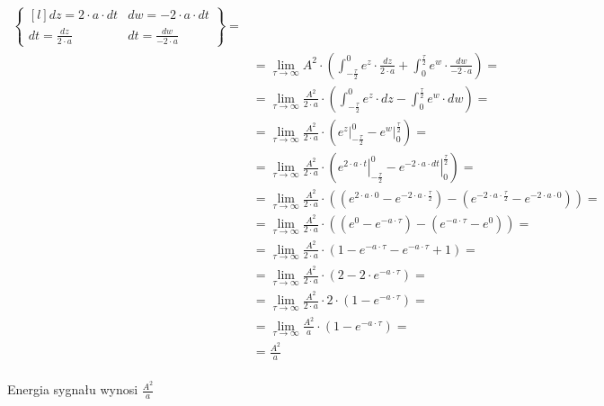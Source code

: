 \begin{task}
\begin{align*}
\begin{Bmatrix*}[l]
   dz = 2 \cdot a \cdot dt & dw=-2 \cdot a \cdot dt\\
   dt = \frac{dz}{2\cdot a} & dt = \frac{dw}{-2 \cdot a}
   \end{Bmatrix*}=\\
 &=\lim_{\tau \rightarrow \infty} A^2 \cdot \left( 
    \int_{-\frac{\tau}{2}}^{0}  e^{z} \cdot \frac{dz}{2\cdot a} 
 +  \int_{0}^{\frac{\tau}{2}} e^{w} \cdot \frac{dw}{-2\cdot a} \right)=\\
 &=\lim_{\tau \rightarrow \infty} \frac{A^2}{2\cdot a} \cdot \left( 
    \int_{-\frac{\tau}{2}}^{0}  e^{z} \cdot dz 
 -  \int_{0}^{\frac{\tau}{2}} e^{w} \cdot dw \right)=\\
 &=\lim_{\tau \rightarrow \infty} \frac{A^2}{2\cdot a} \cdot \left( 
    \left. e^{z} \right|_{-\frac{\tau}{2}}^{0} 
 -  \left. e^{w} \right|_{0}^{\frac{\tau}{2}} \right)=\\ 
 &=\lim_{\tau \rightarrow \infty} \frac{A^2}{2\cdot a} \cdot \left( 
    \left. e^{2\cdot a \cdot t} \right|_{-\frac{\tau}{2}}^{0} 
 -  \left. e^{-2 \cdot a \cdot dt} \right|_{0}^{\frac{\tau}{2}} \right)=\\ 
 &=\lim_{\tau \rightarrow \infty} \frac{A^2}{2\cdot a} \cdot \left( 
    \left(e^{2\cdot a \cdot 0} -e^{-2\cdot a \cdot \frac{\tau}{2}} \right)
 -  \left(e^{-2 \cdot a \cdot \frac{\tau}{2}}-e^{-2 \cdot a \cdot 0} \right) \right)=\\ 
 &=\lim_{\tau \rightarrow \infty} \frac{A^2}{2\cdot a} \cdot \left( 
    \left(e^{0} -e^{-a \cdot \tau} \right)
 -  \left(e^{-a \cdot \tau}-e^{0} \right)\right)=\\
 &=\lim_{\tau \rightarrow \infty} \frac{A^2}{2\cdot a} \cdot \left( 
    1 -e^{-a \cdot \tau} -  e^{-a \cdot \tau}+1 \right)=\\
 &=\lim_{\tau \rightarrow \infty} \frac{A^2}{2\cdot a} \cdot \left( 
    2 - 2\cdot e^{-a \cdot \tau} \right)=\\
 &=\lim_{\tau \rightarrow \infty} \frac{A^2}{2\cdot a} \cdot 2 \cdot \left( 
    1 - e^{-a \cdot \tau} \right)=\\
 &=\lim_{\tau \rightarrow \infty} \frac{A^2}{a} \cdot \left( 
 1 - e^{-a \cdot \tau} \right)=\\
 &= \frac{A^2}{a}\\
\end{align*}

Energia sygnału wynosi $\frac{A^2}{a}$
\end{task}
